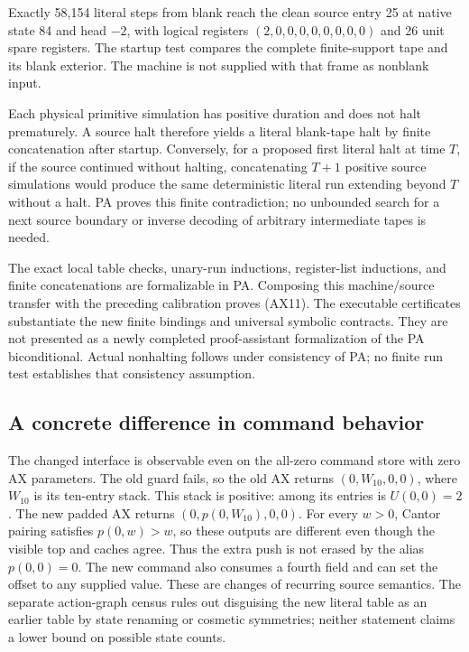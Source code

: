 Exactly 58,154 literal steps from blank reach the clean source entry 25
at native state 84 and head $-2$, with logical registers
$(2,0,0,0,0,0,0,0,0)$ and 26 unit spare registers. The startup test compares
the complete finite-support tape and its blank exterior. The machine is
not supplied with that frame as nonblank input.

Each physical primitive simulation has positive duration and does not
halt prematurely. A source halt therefore yields a literal blank-tape
halt by finite concatenation after startup. Conversely, for a proposed
first literal halt at time $T$, if the source continued without halting,
concatenating $T+1$ positive source simulations would produce the same
deterministic literal run extending beyond $T$ without a halt. PA proves
this finite contradiction; no unbounded search for a next source boundary
or inverse decoding of arbitrary intermediate tapes is needed.

The exact local table checks, unary-run inductions, register-list
inductions, and finite concatenations are formalizable in PA. Composing
this machine/source transfer with the preceding calibration proves
(AX11). The executable certificates substantiate the new finite
bindings and universal symbolic contracts. They are not presented as
a newly completed proof-assistant formalization of the PA biconditional.
Actual nonhalting follows under consistency of PA; no finite run test
establishes that consistency assumption.

\subsection{A concrete difference in command behavior}

The changed interface is observable even on the all-zero command store
with zero AX parameters. The old guard fails, so the old AX returns
$(0,W_{10},0,0)$, where $W_{10}$ is its ten-entry stack. This stack is
positive: among its entries is $U(0,0)=2$. The new padded AX returns
$(0,p(0,W_{10}),0,0)$. For every $w>0$, Cantor pairing satisfies
$p(0,w)>w$, so these outputs are different even though the visible top
and caches agree. Thus the extra push is not erased by the alias
$p(0,0)=0$. The new command also consumes a fourth field and can set the
offset to any supplied value. These are changes of recurring source
semantics. The separate action-graph census rules out disguising the
new literal table as an earlier table by state renaming or cosmetic
symmetries; neither statement claims a lower bound on possible state counts.
